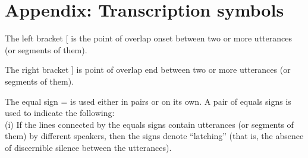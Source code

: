 \documentclass[output=paper]{LSP/langsci}
\begin{document}
\section*{Appendix: Transcription symbols}
\begin{description}
\item 	The left bracket [ is the point of overlap onset between two or more utterances (or segments of them).
\item  The right bracket ] is point of overlap end between two or more utterances (or segments of them).
\item   The equal sign = is used either in pairs or on its own. A pair of equals signs is used to indicate the following:\\
(i) If the lines connected by the equals signs contain utterances (or segments of them) by different speakers, then the signs denote ``latching'' (that is, the absence of discernible silence between the utterances). 


\end{description}
\end{document}
